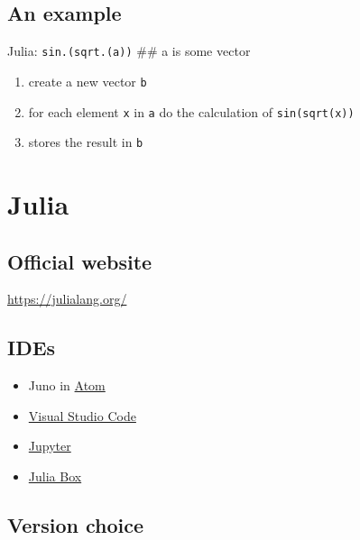 \documentclass[11pt]{article}
\providecommand{\tightlist}{%
      \setlength{\itemsep}{0pt}\setlength{\parskip}{0pt}}
\begin{document}
\hypertarget{an-example}{%
\subsection{An example}\label{an-example}}

Julia: \texttt{sin.(sqrt.(a))} \#\# a is some vector

\begin{enumerate}
\def\labelenumi{\arabic{enumi}.}
\tightlist
\item
  create a new vector \texttt{b}
\item
  for each element \texttt{x} in \texttt{a} do the calculation of
  \texttt{sin(sqrt(x))}
\item
  stores the result in \texttt{b}
\end{enumerate}

    \hypertarget{julia}{%
\section{Julia}\label{julia}}

\hypertarget{official-website}{%
\subsection{Official website}\label{official-website}}

\url{https://julialang.org/}

\hypertarget{ides}{%
\subsection{IDEs}\label{ides}}

\begin{itemize}
\item
  Juno in \href{https://atom.io/}{Atom}
\item
  \href{https://code.visualstudio.com/}{Visual Studio Code}
\item
  \href{https://jupyter.org/try}{Jupyter}
\item
  \href{https://juliabox.com/}{Julia Box}
\end{itemize}

\hypertarget{version-choice}{%
\subsection{Version choice}\label{version-choice}}
\end{document}
